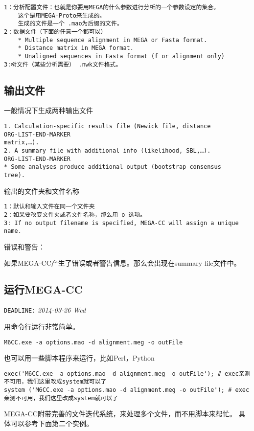 \documentclass[11pt]{ctexart}
\begin{document}
\begin{verbatim}
1：分析配置文件：也就是你要用MEGA的什么参数进行分析的一个参数设定的集合。
    这个是用MEGA-Proto来生成的。
    生成的文件是一个 .mao为后缀的文件。
2：数据文件（下面的任意一个都可以）
    * Multiple sequence alignment in MEGA or Fasta format. 
    * Distance matrix in MEGA format. 
    * Unaligned sequences in Fasta format (f or alignment only)
3:树文件（某些分析需要） .nwk文件格式。
\end{verbatim}
\subsection{输出文件}
\label{sec-3-3}

一般情况下生成两种输出文件


\begin{verbatim}
1. Calculation-specific results file (Newick file, distance 
ORG-LIST-END-MARKER
matrix,…). 
2. A summary file with additional info (likelihood, SBL,…). 
ORG-LIST-END-MARKER
* Some analyses produce additional output (bootstrap consensus 
tree).
\end{verbatim}
输出的文件夹和文件名称


\begin{verbatim}
1：默认和输入文件在同一个文件夹
2：如果要改变文件夹或者文件名称，那么用-o 选项。
3: If no output filename is specified, MEGA-CC will assign a unique 
name.
\end{verbatim}
错误和警告：

如果MEGA-CC产生了错误或者警告信息。那么会出现在summary file文件中。
\subsection{运行MEGA-CC}
\label{sec-3-4}

   \texttt{DEADLINE:} \textit{2014-03-26 Wed}

用命令行运行非常简单。

\begin{verbatim}
M6CC.exe -a options.mao -d alignment.meg -o outFile
\end{verbatim}
也可以用一些脚本程序来运行，比如Perl，Python

\begin{verbatim}
exec('M6CC.exe -a options.mao -d alignment.meg -o outFile'); # exec亲测不可用，我们这里改成system就可以了
system ('M6CC.exe -a options.mao -d alignment.meg -o outFile'); # exec亲测不可用，我们这里改成system就可以了
\end{verbatim}
MEGA-CC附带完善的文件迭代系统，来处理多个文件，而不用脚本来帮忙。
具体可以参考下面第二个实例。
\end{document}
